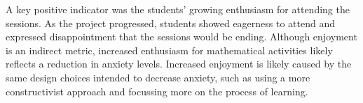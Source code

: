 \documentclass[11pt, a4paper, notitlepage]{article}
\begin{document}
\par
A key positive indicator was the students' growing enthusiasm for attending the sessions. As the project progressed, students showed eagerness to attend and expressed disappointment that the sessions would be ending. Although enjoyment is an indirect metric, increased enthusiasm for mathematical activities likely reflects a reduction in anxiety levels. Increased enjoyment is likely caused by the same design choices intended to decrease anxiety, such as using a more constructivist approach and focussing more on the process of learning.

\end{document}
